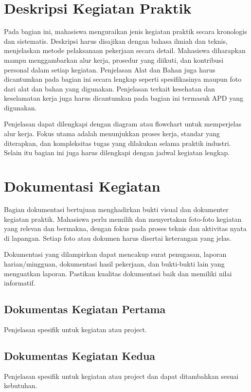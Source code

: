 \section{Deskripsi Kegiatan Praktik}
Pada bagian ini, mahasiswa menguraikan jenis kegiatan praktik secara kronologis dan sistematis. Deskripsi harus disajikan dengan bahasa ilmiah dan teknis, menjelaskan metode pelaksanaan pekerjaan secara detail. Mahasiswa diharapkan mampu menggambarkan alur kerja, prosedur yang diikuti, dan kontribusi personal dalam setiap kegiatan. Penjelasan Alat dan Bahan juga harus dicantumkan pada bagian ini secara lengkap seperti spesifikasinya maupun foto dari alat dan bahan yang digunakan. Penjelasan terkait kesehatan dan keselamatan kerja juga harus dicantumkan pada bagian ini termasuk APD yang digunakan.

Penjelasan dapat dilengkapi dengan diagram atau flowchart untuk memperjelas alur kerja. Fokus utama adalah menunjukkan proses kerja, standar yang diterapkan, dan kompleksitas tugas yang dilakukan selama praktik industri. Selain itu bagian ini juga harus dilengkapi dengan jadwal kegiatan lengkap.

\section{Dokumentasi Kegiatan}
Bagian dokumentasi bertujuan menghadirkan bukti visual dan dokumenter kegiatan praktik. Mahasiswa perlu memilih dan menyertakan foto-foto kegiatan yang relevan dan bermakna, dengan fokus pada proses teknis dan aktivitas nyata di lapangan. Setiap foto atau dokumen harus disertai keterangan yang jelas.

Dokumentasi yang dilampirkan dapat mencakup surat penugasan, laporan harian/mingguan, dokumentasi hasil pekerjaan, dan bukti-bukti lain yang menguatkan laporan. Pastikan kualitas dokumentasi baik dan memiliki nilai informatif.

\subsection{Dokumentas Kegiatan Pertama}
Penjelasan spesifik untuk kegiatan atau project.

\subsection{Dokumentas Kegiatan Kedua}
Penjelasan spesifik untuk kegiatan atau project dan dapat ditambahkan sesuai kebutuhan.


